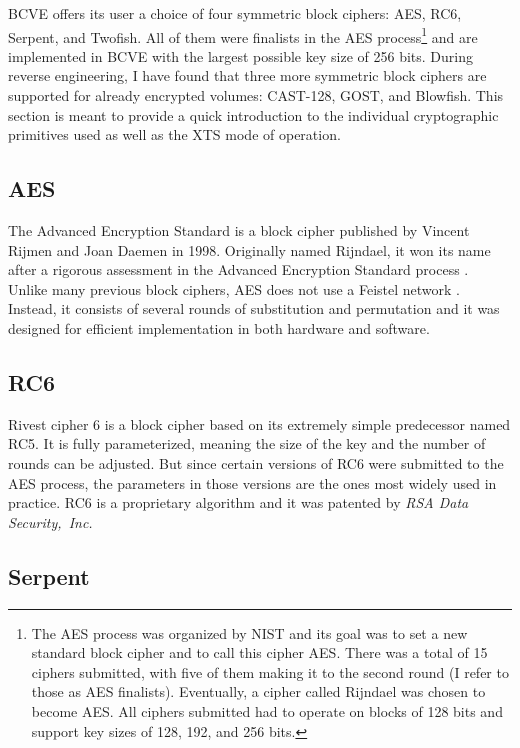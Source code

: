 \documentclass[thesis=B,english]{FITthesis}[2012/10/20]
\begin{document}
	BCVE offers its user a choice of four symmetric block ciphers: AES, RC6, Serpent, and Twofish. 
	All of them were finalists in the AES process\footnote{The AES process was organized by NIST and its goal was to set a new standard block cipher and to call this cipher AES. There was a total of 15 ciphers submitted, with five of them making it to the second round (I refer to those as AES finalists). Eventually, a cipher called Rijndael was chosen to become AES. All ciphers submitted had to operate on blocks of 128 bits and support key sizes of 128, 192, and 256 bits.} and are implemented in BCVE with the largest possible key size of 256 bits. During reverse engineering, I have found  that three more symmetric block ciphers are supported for already encrypted volumes: CAST-128, GOST, and Blowfish. This section is meant to provide a quick introduction to the individual cryptographic primitives used as well as the XTS mode of operation.
	
	\subsection{AES}
	
	The Advanced Encryption Standard \cite{rijndael} is a block cipher published by Vincent Rijmen and Joan Daemen in 1998. Originally named Rijndael, it won its name after a rigorous assessment in the Advanced Encryption Standard process \cite{aes}. Unlike many previous block ciphers, AES does not use a Feistel network \cite{feistel}. Instead, it consists of several rounds of substitution and permutation and it was designed for efficient implementation in both hardware and software. 
	
	\subsection{RC6}
	
	Rivest cipher 6 \cite{rc6} is a block cipher based on its extremely simple predecessor named RC5. It is fully parameterized, meaning the size of the key and the number of rounds can be adjusted. But since certain versions of RC6 were submitted to the AES process, the parameters in those versions are the ones most widely used in practice. RC6 is a proprietary algorithm and it was patented by \textit{RSA Data Security,~Inc.}
	
	\subsection{Serpent}
	
\end{document}
